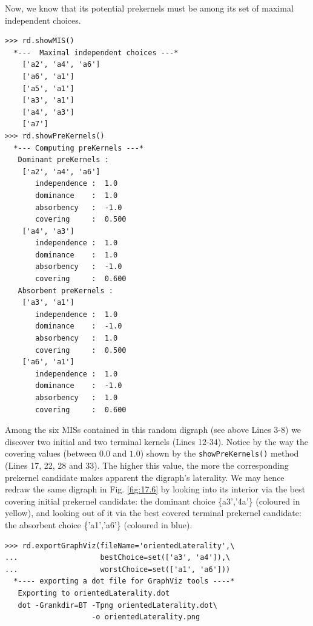 Now, we know that its potential prekernels must be among its set of maximal independent choices. 

\begin{lstlisting}
>>> rd.showMIS()
  *---  Maximal independent choices ---*
    ['a2', 'a4', 'a6']
    ['a6', 'a1']
    ['a5', 'a1']
    ['a3', 'a1']
    ['a4', 'a3']
    ['a7']
>>> rd.showPreKernels()
  *--- Computing preKernels ---*
   Dominant preKernels :
    ['a2', 'a4', 'a6']
       independence :  1.0
       dominance    :  1.0
       absorbency   :  -1.0
       covering     :  0.500
    ['a4', 'a3']
       independence :  1.0
       dominance    :  1.0
       absorbency   :  -1.0
       covering     :  0.600
   Absorbent preKernels :
    ['a3', 'a1']
       independence :  1.0
       dominance    :  -1.0
       absorbency   :  1.0
       covering     :  0.500
    ['a6', 'a1']
       independence :  1.0
       dominance    :  -1.0
       absorbency   :  1.0
       covering     :  0.600
\end{lstlisting}
     
Among the six MISs contained in this random digraph (see above Lines 3-8) we discover two initial and two terminal kernels (Lines 12-34). Notice by the way the covering values (between $0.0$ and $1.0$) shown by the \texttt{showPreKernels()} method (Lines 17, 22, 28 and 33). The higher this value, the more the corresponding prekernel candidate makes apparent the digraph's laterality. We may hence redraw the same digraph in Fig. \ref{fig:17.6} by looking into its interior via the best covering initial prekernel candidate: the dominant choice \{a3','4a'\} (coloured in yellow), and looking out of it via the best covered terminal prekernel candidate: the absorbent choice \{'a1','a6'\} (coloured in blue).

\begin{lstlisting}
>>> rd.exportGraphViz(fileName='orientedLaterality',\
...                   bestChoice=set(['a3', 'a4']),\
...                   worstChoice=set(['a1', 'a6']))
  *---- exporting a dot file for GraphViz tools ----*
   Exporting to orientedLaterality.dot
   dot -Grankdir=BT -Tpng orientedLaterality.dot\
                    -o orientedLaterality.png
\end{lstlisting}

